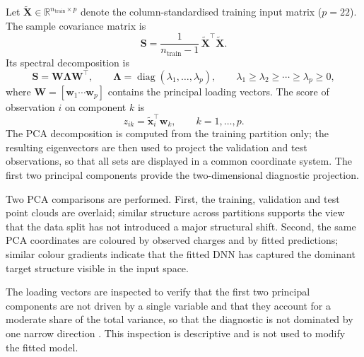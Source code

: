 Let
$\widetilde{\mathbf{X}} \in \mathbb{R}^{n_{\mathrm{train}} \times p}$
denote the column-standardised training input matrix ($p = 22$).  The
sample covariance matrix is
\begin{equation}
    \mathbf{S}
    = \frac{1}{n_{\mathrm{train}}-1}\,
      \widetilde{\mathbf{X}}^{\!\top}\widetilde{\mathbf{X}} .
    \label{eq:pca_covariance_matrix}
\end{equation}
Its spectral decomposition is
\begin{equation}
    \mathbf{S}
    = \mathbf{W}\boldsymbol{\Lambda}\mathbf{W}^{\!\top},
    \qquad
    \boldsymbol{\Lambda}
    = \operatorname{diag}(\lambda_1,\dots,\lambda_p),
    \qquad
    \lambda_1 \geq \lambda_2 \geq \cdots \geq \lambda_p \geq 0 ,
    \label{eq:pca_eigendecomposition}
\end{equation}
where $\mathbf{W} = [\mathbf{w}_1 \cdots \mathbf{w}_p]$ contains the
principal loading vectors.  The score of observation $i$ on component
$k$ is
\begin{equation}
    z_{ik} = \widetilde{\mathbf{x}}_i^{\!\top}\mathbf{w}_k,
    \qquad k = 1,\dots,p .
    \label{eq:pca_scores}
\end{equation}
The PCA decomposition is computed from the training partition only; the
resulting eigenvectors are then used to project the validation and test
observations, so that all sets are displayed in a common coordinate system.
The first two principal components provide the two-dimensional diagnostic
projection.

Two PCA comparisons are performed.  First, the training, validation and test
point clouds are overlaid; similar structure across partitions supports the
view that the data split has not introduced a major structural shift.
Second, the same PCA coordinates are coloured by observed charges and by
fitted predictions; similar colour gradients indicate that the fitted
DNN has captured the dominant target structure visible in the input
space.

The loading vectors are inspected to verify that the first two principal
components are not driven by a single variable and that they account for a
moderate share of the total variance, so that the diagnostic is not
dominated by one narrow direction \citep{hastie2009elements}.  This
inspection is descriptive and is not used to modify the fitted model.

